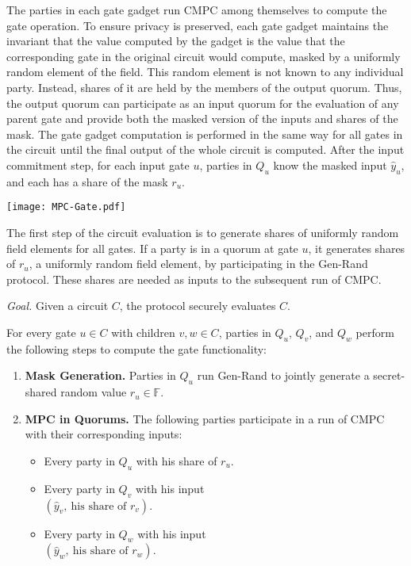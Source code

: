 \documentclass[11pt,letter]{article}
\newcommand{\alg}[1]{\mbox{\textsf{#1}}}
\newcommand{\mask}[1]{\widehat{#1}}
\newcommand{\F}{\mathbb{F}}
\theoremstyle{mytheoremstyle}
\let\savedCaption=\caption
\renewcommand*{\caption}[1]{\savedCaption[#1]{~#1}}
\newcommand{\algfont}{}
\newcommand{\hw}{\mbox{\textsf{CMPC}}\xspace}
\newcommand{\ce}{\textsf{Circuit-Eval}\xspace}
\begin{document}
The parties in each gate gadget run \hw among themselves to compute the gate operation. To ensure privacy is preserved, each gate gadget maintains the invariant that the value computed by the gadget is the value that the corresponding gate in the original circuit would compute, masked by a uniformly random element of the field. This random element is not known to any individual party. Instead, shares of it are held by the members of the output quorum. Thus, the output quorum can participate as an input quorum for the evaluation of any parent gate and provide both the masked version of the inputs and shares of the mask.
The gate gadget computation is performed in the same way for all gates in the circuit until the final output of the whole circuit is computed. After the input commitment step, for each input gate $u$, parties in $Q_u$ know the masked input $\mask{y}_u$, and each has a share of the mask $r_u$.
\begin{figure*}[t]
	\begin{center}
		\texttt{[image: MPC-Gate.pdf]}
	\end{center}
	\caption{Evaluation of gate $u$: (a) generating $r_u$, (b) providing inputs to \alg{CMPC}, (c) receiving the masked outputs }
	\label{f:quorums}
\end{figure*}

The first step of the circuit evaluation is to generate shares of uniformly random field elements for all gates. If a party is in a quorum at gate $u$, it generates shares of $r_u$, a uniformly random field element, by participating in the \alg{Gen-Rand} protocol. These shares are needed as inputs to the subsequent run of \hw.

\begin{algorithm}
	\caption{\ce}\label{pro:ce}
	\medskip
	\algfont
	\textit{Goal.} Given a circuit $C$, the protocol securely evaluates $C$.
	
	\smallskip
	For every gate $u \in C$ with children $v,w \in C$, parties in $Q_u$, $Q_v$, and $Q_w$ perform the following steps to compute the gate functionality:
	\begin{enumerate}
		\item \textbf{Mask Generation.} Parties in $Q_u$ run \alg{Gen-Rand} to jointly generate a secret-shared random value \mbox{$r_u \in \F$}.
		
		\item \textbf{MPC in Quorums.} The following parties participate in a run of \hw with their corresponding inputs:
		\begin{itemize}
			\item Every party in $Q_u$ with his share of $r_u$.
			\item Every party in $Q_v$ with his input \\$\left(\mask{y}_v,~\text{his share of }r_v\right)$.
			\item Every party in $Q_w$ with his input \\$\left(\mask{y}_w,~\text{his share of }r_w\right)$.			
		\end{itemize}
		
\end{enumerate}
\end{algorithm}
\end{document}
